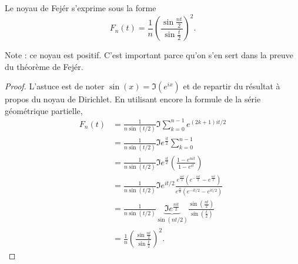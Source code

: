 \begin{lemma}   \label{LemtCAjJz}
    Le noyau de Fejér s'exprime sous la forme
    \begin{equation}    \label{EqLOtzCf}
        F_n(t)=\frac{1}{ n }\left( \frac{ \sin\frac{ nt }{2} }{ \sin\frac{ t }{2} } \right)^2.
    \end{equation}
\end{lemma}
Note : ce noyau est positif. C'est important parce qu'on s'en sert dans la preuve du théorème de Fejér.

\begin{proof}
    L'astuce est de noter \( \sin(x)=\Im( e^{ix})\) et de repartir du résultat à propos du noyau de Dirichlet. En utilisant encore la formule de la série géométrique partielle,
    \begin{subequations}
        \begin{align}
            F_n(t)&=\frac{1}{ n\sin(t/2) }\Im\sum_{k=0}^{n-1} e^{(2k+1)it/2}\\
            &=\frac{1}{ n\sin(t/2) }\Im e^{\frac{ it }{ 2 }}\sum_{k=0}^{n-1}\\
            &=\frac{1}{ n\sin(t/2) }\Im e^{\frac{ it }{ 2 }}\left( \frac{ 1- e^{nit} }{ 1- e^{it} } \right)\\
            &=\frac{1}{ n\sin(t/2) }\Im e^{it/2}\frac{  e^{\frac{ nit }{ 2 }}\left(  e^{-\frac{ int }{2}}- e^{\frac{ nit }{2}} \right) }{  e^{\frac{ it }{2}}\left(  e^{-it/2}- e^{it/2} \right) }\\
            &=\frac{1}{ n\sin(t/2) }\underbrace{\Im e^{\frac{ nit }{2}}}_{\sin(nt/2)}\frac{ \sin\left( \frac{ nt }{ 2 } \right) }{ \sin(\frac{ t }{2}) }\\
            &=\frac{1}{ n }\left( \frac{ \sin\frac{ nt }{2} }{ \sin\frac{ t }{2} } \right)^2.
        \end{align}
    \end{subequations}
\end{proof}



